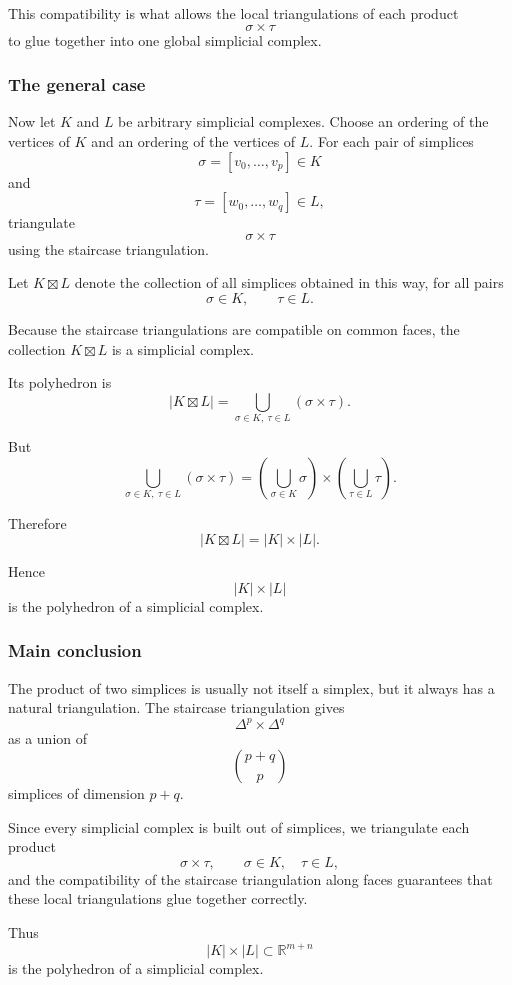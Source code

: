 \documentclass[12pt,a4paper]{article}
\theoremstyle{notespace}
\begin{document}
This compatibility is what allows the local triangulations of each product
\[
\sigma\times \tau
\]
to glue together into one global simplicial complex.

\subsubsection{The general case}

Now let \(K\) and \(L\) be arbitrary simplicial complexes. Choose an ordering of the vertices of \(K\) and an ordering of the vertices of \(L\). For each pair of simplices
\[
\sigma=[v_0,\dots,v_p]\in K
\]
and
\[
\tau=[w_0,\dots,w_q]\in L,
\]
triangulate
\[
\sigma\times \tau
\]
using the staircase triangulation.

Let \(K\boxtimes L\) denote the collection of all simplices obtained in this way, for all pairs
\[
\sigma\in K,
\qquad
\tau\in L.
\]

Because the staircase triangulations are compatible on common faces, the collection \(K\boxtimes L\) is a simplicial complex.

Its polyhedron is
\[
|K\boxtimes L|
=
\bigcup_{\sigma\in K,\ \tau\in L}(\sigma\times \tau).
\]

But
\[
\bigcup_{\sigma\in K,\ \tau\in L}(\sigma\times \tau)
=
\left(\bigcup_{\sigma\in K}\sigma\right)
\times
\left(\bigcup_{\tau\in L}\tau\right).
\]

Therefore
\[
|K\boxtimes L|
=
|K|\times |L|.
\]

Hence
\[
|K|\times |L|
\]
is the polyhedron of a simplicial complex.

\subsubsection{Main conclusion}

The product of two simplices is usually not itself a simplex, but it always has a natural triangulation. The staircase triangulation gives
\[
\Delta^p\times \Delta^q
\]
as a union of
\[
\binom{p+q}{p}
\]
simplices of dimension \(p+q\).

Since every simplicial complex is built out of simplices, we triangulate each product
\[
\sigma\times \tau,
\qquad
\sigma\in K,\quad \tau\in L,
\]
and the compatibility of the staircase triangulation along faces guarantees that these local triangulations glue together correctly.

Thus
\[
|K|\times |L|\subset \mathbb R^{m+n}
\]
is the polyhedron of a simplicial complex.
\end{document}
